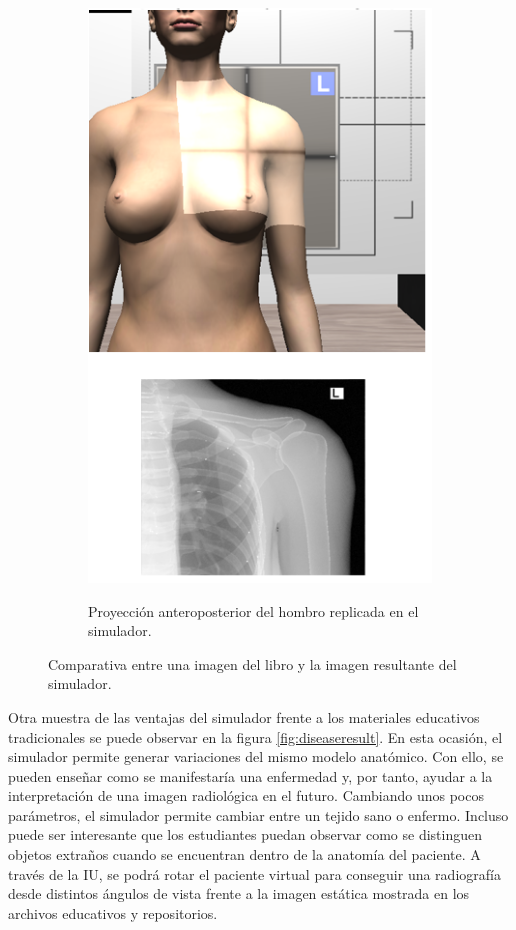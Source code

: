 \begin{figure}[h]
\begin{subfigure}[b]{0.45\linewidth}
        {\includegraphics[width=\linewidth]{IMG/XRayshoulder3.png}}
        \caption{Proyección anteroposterior del hombro replicada en el simulador.}
    \end{subfigure}
    \caption{\label{fig:xraycomp} Comparativa entre una imagen del libro\cite{carver2012medical} y la imagen resultante del simulador.}
   \end{figure}

Otra muestra de las ventajas del simulador frente a los materiales educativos tradicionales se puede observar en la figura \ref{fig:diseaseresult}. En esta ocasión, el simulador permite generar variaciones del mismo modelo anatómico. Con ello, se pueden enseñar como se manifestaría una enfermedad y, por tanto, ayudar a la interpretación de una imagen radiológica en el futuro. Cambiando unos pocos parámetros, el simulador permite cambiar entre un tejido sano o enfermo. Incluso puede ser interesante que los estudiantes puedan observar como se distinguen objetos extraños cuando se encuentran dentro de la anatomía del paciente. A través de la \ac{IU}, se podrá rotar el paciente virtual para conseguir una radiografía desde distintos ángulos de vista frente a la imagen estática mostrada en los archivos educativos y repositorios.

